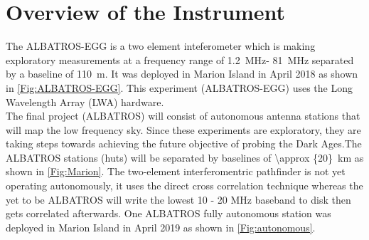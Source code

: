 \documentclass{ws-jai}
\begin{document}
\section{Overview of the Instrument}

%
%
%
%
%
The ALBATROS-EGG is a two element inteferometer which is making exploratory measurements at a frequency range of \SI{1.2}{MHz}- \SI{81}{MHz} separated by a baseline of \SI{110}{m}. It was deployed in Marion Island in April 2018 as shown in \autoref{Fig:ALBATROS-EGG}. This experiment (ALBATROS-EGG) uses the Long Wavelength Array (LWA) hardware.\\

The final project (ALBATROS) will consist of autonomous antenna stations that will map the low frequency sky. Since these experiments are exploratory, they are taking steps towards achieving the future objective of probing the Dark Ages.The ALBATROS stations (huts) will be separated by baselines of \SI{\approx {20}}{km} as shown in \autoref{Fig:Marion}. The two-element interferomentric pathfinder is not yet operating autonomously, it uses the direct cross correlation technique whereas the yet to be ALBATROS will write the lowest 10 - 20 MHz baseband to disk then gets correlated afterwards. One ALBATROS fully autonomous station was deployed in Marion Island in April 2019 as shown in \autoref{Fig:autonomous}. \\
\end{document}
